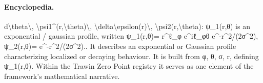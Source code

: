 \paragraph{Encyclopedia.}
d\textbackslash{}theta\textbackslash{}, \textbackslash{}psi1\textasciicircum{}(r,\textbackslash{}theta)\textbackslash{}, \textbackslash{}delta\textbackslash{}epsilon(r)\textbackslash{}, \textbackslash{}psi2(r,\textbackslash{}theta): ψ\_1(r,θ) is an exponential / gaussian profile, written ψ\_1(r,θ)= r\textasciicircum{}ℓ\_φ e\textasciicircum{}iℓ\_φθ e\textasciicircum{}-r\textasciicircum{}2/(2σ\textasciicircum{}2), ψ\_2(r,θ)= e\textasciicircum{}-r\textasciicircum{}2/(2σ\textasciicircum{}2).. It describes an exponential or Gaussian profile characterizing localized or decaying behaviour. It is built from φ, θ, σ, r, defining ψ\_1(r,θ). Within the Trawin Zero Point registry it serves as one element of the framework's mathematical narrative.
